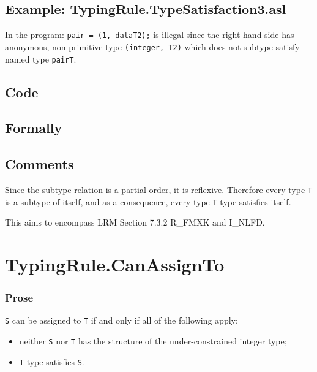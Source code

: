 \documentclass{book}
\begin{document}
\subsection{Example: TypingRule.TypeSatisfaction3.asl}
    In the program:
    \texttt{pair = (1, dataT2);} is illegal since the right-hand-side has anonymous,
    non-primitive type \texttt{(integer, T2)} which does not subtype-satisfy named
    type \texttt{pairT}.

  \subsection{Code}

\begin{emptyformal}
    \subsection{Formally}
\end{emptyformal}

\subsection{Comments}
  Since the subtype relation is a partial order, it is reflexive. Therefore
  every type \texttt{T} is a subtype of itself, and as a consequence, every type \texttt{T}
  type-satisfies itself.
  
  This aims to encompass LRM Section 7.3.2 R\_FMXK and I\_NLFD.

\section{TypingRule.CanAssignTo \label{sec:TypingRule.CanAssignTo}}

  \subsubsection{Prose}
  \texttt{S} can be assigned to \texttt{T} if and only if all of the following apply:
  \begin{itemize}
  \item neither \texttt{S} nor \texttt{T} has the structure of the under-constrained integer type;
  \item \texttt{T} type-satisfies \texttt{S}.
  \end{itemize} 
 
\end{document}
